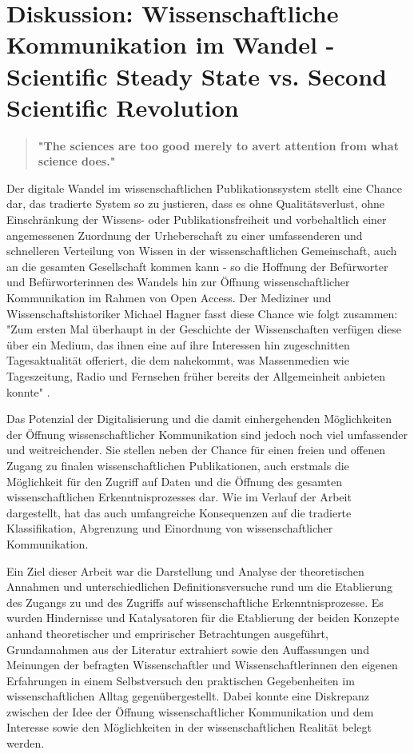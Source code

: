 \chapter{Diskussion: Wissenschaftliche Kommunikation im Wandel - Scientific Steady State vs. Second Scientific Revolution}

\begin{quote}
\textbf{"The sciences are too good merely to avert attention from what science does."}
\end{quote} \cite{kittler_2004}

Der digitale Wandel im wissenschaftlichen Publikationssystem stellt eine Chance dar, das tradierte System so zu justieren, dass es ohne Qualitätsverlust, ohne Einschränkung der Wissens- oder Publikationsfreiheit und vorbehaltlich einer angemessenen Zuordnung der Urheberschaft zu einer umfassenderen und schnelleren Verteilung von Wissen in der wissenschaftlichen Gemeinschaft, auch an die gesamten Gesellschaft kommen kann - so die Hoffnung der Befürworter und Befürworterinnen des Wandels hin zur Öffnung wissenschaftlicher Kommunikation im Rahmen von Open Access. Der Mediziner und Wissenschaftshistoriker Michael Hagner fasst diese Chance wie folgt zusammen: "Zum ersten Mal überhaupt in der Geschichte der Wissenschaften verfügen diese über ein Medium, das ihnen eine auf ihre Interessen hin zugeschnitten Tagesaktualität offeriert, die dem nahekommt, was Massenmedien wie Tageszeitung, Radio und Fernsehen früher bereits der Allgemeinheit anbieten konnte" \cite{hagner_2015_sache_buches}.

Das Potenzial der Digitalisierung und die damit einhergehenden Möglichkeiten der Öffnung wissenschaftlicher Kommunikation sind jedoch noch viel umfassender und weitreichender. Sie stellen neben der Chance für einen freien und offenen Zugang zu finalen wissenschaftlichen Publikationen, auch erstmals die Möglichkeit für den Zugriff auf Daten und die Öffnung des gesamten wissenschaftlichen Erkenntnisprozesses dar. Wie im Verlauf der Arbeit dargestellt, hat das auch umfangreiche Konsequenzen auf die tradierte Klassifikation, Abgrenzung und Einordnung von wissenschaftlicher Kommunikation.

Ein Ziel dieser Arbeit war die Darstellung und Analyse der theoretischen Annahmen und unterschiedlichen Definitionsversuche rund um die Etablierung des Zugangs zu und des Zugriffs auf wissenschaftliche Erkenntnisprozesse. Es wurden Hindernisse und Katalysatoren für die Etablierung der beiden Konzepte anhand theoretischer und empririscher Betrachtungen ausgeführt, Grundannahmen aus der Literatur extrahiert sowie den Auffassungen und Meinungen der befragten Wissenschaftler und Wissenschaftlerinnen den eigenen Erfahrungen in einem Selbstversuch den praktischen Gegebenheiten im wissenschaftlichen Alltag gegenübergestellt. Dabei konnte eine Diskrepanz zwischen der Idee der Öffnung wissenschaftlicher Kommunikation und dem Interesse sowie den Möglichkeiten in der wissenschaftlichen Realität belegt werden.

